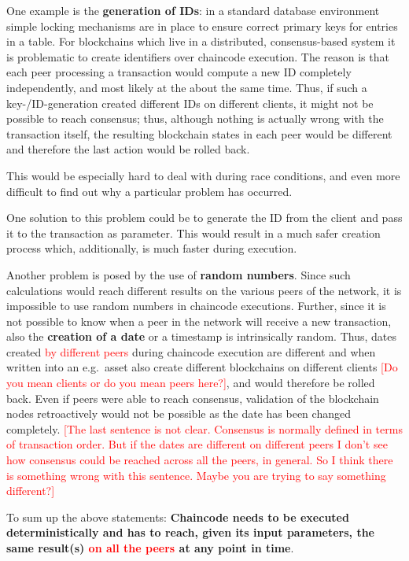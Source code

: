 One example is the \textbf{generation of IDs}:  in a standard database environment simple locking mechanisms are in place to ensure correct primary keys for entries in a table. For blockchains which live in a distributed, consensus-based system it is problematic to create identifiers over chaincode execution. The reason is that each peer processing a transaction would compute a new ID completely independently, and most likely at the about the same time. Thus, if such a key-/ID-generation created different IDs on different clients, it might not be possible to reach consensus; thus, although nothing is actually wrong with the transaction itself, the resulting blockchain states in each peer would be different and therefore the last action would be rolled back.

This would be especially hard to deal with during race conditions, and even more difficult to find out why a particular problem has occurred.

One solution to this problem could be to generate the ID from the client and pass it to the transaction as parameter. This would result in a much safer creation process which, additionally, is much faster during execution.

Another problem is posed by the use of \textbf{random numbers}. Since such calculations would reach different results on the various peers of the network, it is impossible to use random numbers in chaincode executions. Further, since it is not possible to know when a peer in the network will receive a new transaction, also the \textbf{creation of a date} or a timestamp is intrinsically random. Thus, dates created \textcolor{red}{by different peers} during chaincode execution are different and when written into an e.g.\ asset also create different blockchains on different clients \textcolor{red}{[Do you mean clients or do you mean peers here?]}, and would therefore be rolled back. Even if peers were able to reach consensus, validation of the blockchain nodes retroactively would not be possible as the date has been changed completely. \textcolor{red}{[The last sentence is not clear. Consensus is normally defined in terms of transaction order. But if the dates are different on different peers I don't see how consensus could be reached across all the peers, in general. So I think there is something wrong with this sentence. Maybe you are trying to say something different?]}

To sum up the above statements: \textbf{Chaincode needs to be executed deterministically and has to reach, given its input parameters, the same result(s) \textcolor{red}{on all the peers} at any point in time}.

